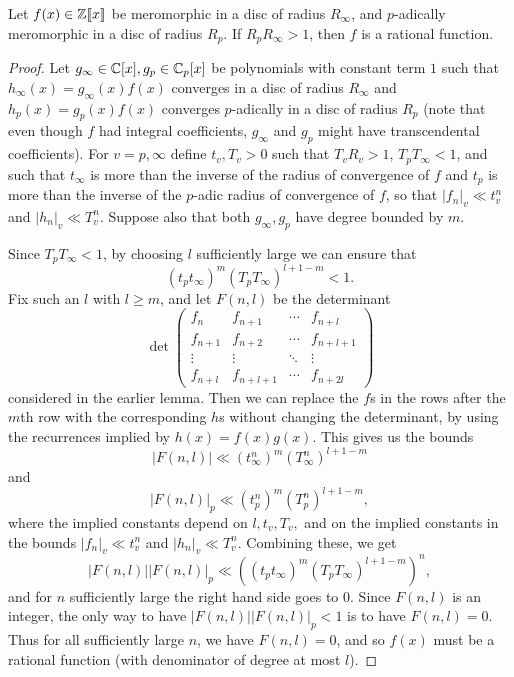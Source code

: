 \begin{thm} Let $f(x) \in \mathbb{Z}[\![x]\!]$ be meromorphic in a disc of radius $R_{\infty}$, and $p$-adically meromorphic in a disc of radius $R_p$. If $R_pR_{\infty} > 1$, then $f$ is a rational function.
\end{thm}
\begin{proof} Let $g_{\infty} \in \mathbb{C}[x], g_p \in \mathbb{C}_p[x]$ be polynomials with constant term $1$ such that $h_{\infty}(x) = g_\infty(x)f(x)$ converges in a disc of radius $R_{\infty}$ and $h_p(x) = g_p(x)f(x)$ converges $p$-adically in a disc of radius $R_p$ (note that even though $f$ had integral coefficients, $g_{\infty}$ and $g_p$ might have transcendental coefficients). For $v = p, \infty$ define $t_v, T_v > 0$ such that $T_vR_v > 1$, $T_pT_\infty < 1$, and such that $t_{\infty}$ is more than the inverse of the radius of convergence of $f$ and $t_p$ is more than the inverse of the $p$-adic radius of convergence of $f$, so that $|f_n|_v \ll t_v^n$ and $|h_n|_v \ll T_v^n$. Suppose also that both $g_\infty, g_p$ have degree bounded by $m$.

Since $T_pT_{\infty} < 1$, by choosing $l$ sufficiently large we can ensure that
\[
(t_pt_{\infty})^m (T_pT_{\infty})^{l+1-m} < 1.
\]
Fix such an $l$ with $l \ge m$, and let $F(n,l)$ be the determinant
\[
\det\begin{pmatrix}f_n & f_{n+1} & \cdots & f_{n+l} \\ f_{n+1} & f_{n+2} & \cdots & f_{n+l+1}\\ \vdots & \vdots & \ddots & \vdots \\ f_{n+l} & f_{n+l+1} & \cdots & f_{n+2l}\end{pmatrix}
\]
considered in the earlier lemma. Then we can replace the $f$s in the rows after the $m$th row with the corresponding $h$s without changing the determinant, by using the recurrences implied by $h(x) = f(x)g(x)$. This gives us the bounds
\[
|F(n,l)| \ll (t_{\infty}^n)^m (T_{\infty}^n)^{l+1-m}
\]
and
\[
|F(n,l)|_p \ll (t_p^n)^m (T_p^n)^{l+1-m},
\]
where the implied constants depend on $l, t_v, T_v,$ and on the implied constants in the bounds $|f_n|_v \ll t_v^n$ and $|h_n|_v \ll T_v^n$.
Combining these, we get
\[
|F(n,l)||F(n,l)|_p \ll ((t_pt_{\infty})^m (T_pT_{\infty})^{l+1-m})^n,
\]
and for $n$ sufficiently large the right hand side goes to $0$. Since $F(n,l)$ is an integer, the only way to have $|F(n,l)||F(n,l)|_p < 1$ is to have $F(n,l) = 0$. Thus for all sufficiently large $n$, we have $F(n,l) = 0$, and so $f(x)$ must be a rational function (with denominator of degree at most $l$).
\end{proof}

